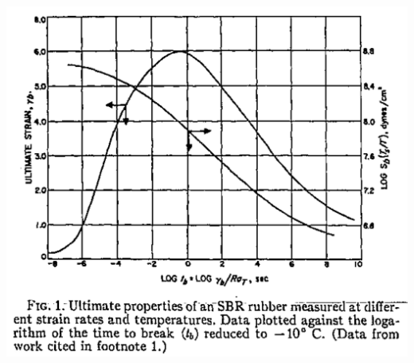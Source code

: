 \documentclass[12pt, dvipdfmx]{beamer}
\begin{document}
\begin{frame}
\begin{columns}[T, totalwidth=\textwidth]
				\includegraphics[width=.8\textwidth]{Time_Temp_2.png}
		\end{columns}
\end{frame}
\end{document}
